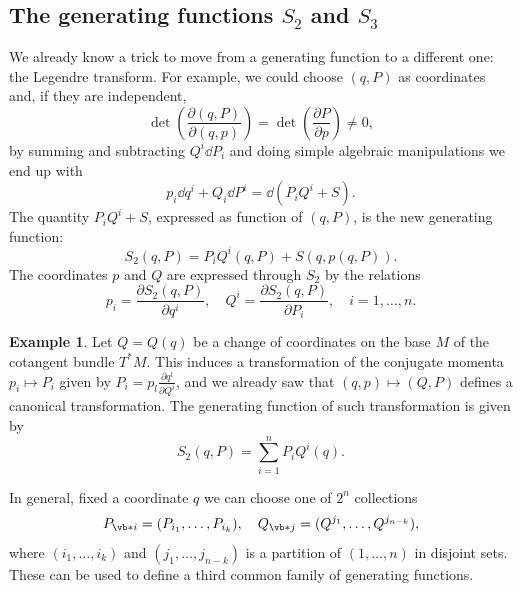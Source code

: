 \documentclass[english,fontsize=11pt,paper=b5]{scrbook}
\numberwithin{equation}{chapter}
\theoremstyle{definition}
\newtheorem{example}{Example}[chapter]
\begin{document}
    \subsection{The generating functions $S_2$ and $S_3$}

    We already know a trick to move from a generating function to a different one: the Legendre transform.
    For example, we could choose $(q,P)$ as coordinates and, if they are independent,
    \begin{equation}
      \det\left( \frac{\partial(q,P)}{\partial(q,p)}\right) = \det\left( \frac{\partial P}{\partial p} \right)\neq 0,
    \end{equation}
    by summing and subtracting $Q^i\dd P_i$ and doing simple algebraic manipulations we end up with
    \begin{equation}
      p_i \dd q^i + Q_i \dd P^i = \dd (P_iQ^i + S).
    \end{equation}
    The quantity $P_iQ^i + S$, expressed as function of $(q,P)$, is the new generating function:
    \begin{equation}
      S_2(q,P) = P_i Q^i(q,P) + S(q, p(q,P)).
    \end{equation}
    The coordinates $p$ and $Q$ are expressed through $S_2$ by the relations
    \begin{equation}\label{eq:coordgenfun2}
      p_i = \frac{\partial S_2(q,P)}{\partial q^i},\quad
      Q^i = \frac{\partial S_2(q,P)}{\partial P_i},\quad
      i=1,\ldots,n.
    \end{equation}

    \begin{example}
      Let $Q=Q(q)$ be a change of coordinates on the base $M$ of the cotangent bundle $T^*M$.
      This induces a transformation of the conjugate momenta $p_i\mapsto P_i$ given by $P_i = p_l \frac{\partial q^l}{\partial Q^i}$, and we already saw that $(q,p)\mapsto(Q,P)$ defines a canonical transformation.
      The generating function of such transformation is given by
      \begin{equation}
        S_2(q,P) = \sum_{i=1}^n P_i Q^i(q).
      \end{equation}
    \end{example}

    In general, fixed a coordinate $q$ we can choose one of $2^n$ collections
    \begin{equation}\label{eq:PQcollection}
      P_{\vb*{i}} = (P_{i_1}, \ldots, P_{i_k}), \quad
      Q_{\vb*{j}} = (Q^{j_1}, \ldots, Q^{j_{n-k}}),
    \end{equation}
    where $(i_1, \ldots, i_k)$ and $(j_1, \ldots, j_{n-k})$ is a partition of $(1,\ldots,n)$ in disjoint sets.
    These can be used to define a third common family of generating functions.
\end{document}
